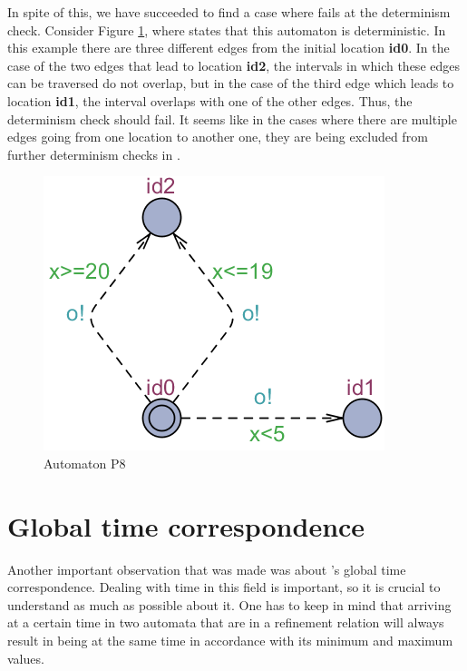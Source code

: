In spite of this, we have succeeded to find a case where \ecdar fails at the determinism check. Consider Figure \ref{fig:P8}, where \ecdar states that this automaton is deterministic. In this example there are three different edges from the initial location \textbf{id0}. In the case of the two edges that lead to location \textbf{id2}, the intervals in which these edges can be traversed do not overlap, but in the case of the third edge which leads to location \textbf{id1}, the interval overlaps with one of the other edges. Thus, the determinism check should fail. It seems like in the cases where there are multiple edges going from one location to another one, they are being excluded from further determinism checks in \ecdar.
\begin{figure}
    \centering
    \includegraphics[scale = 0.7]{figures/P8.png}
    \caption{Automaton P8}
    \label{fig:P8}
\end{figure}
\section{Global time correspondence}\label{sec:globalTime}
Another important observation that was made was about \ecdar's global time correspondence. Dealing with time in this field is important, so it is crucial to understand as much as possible about it. One has to keep in mind that arriving at a certain time in two automata that are in a refinement relation will always result in being at the same time in accordance with its minimum and maximum values.

